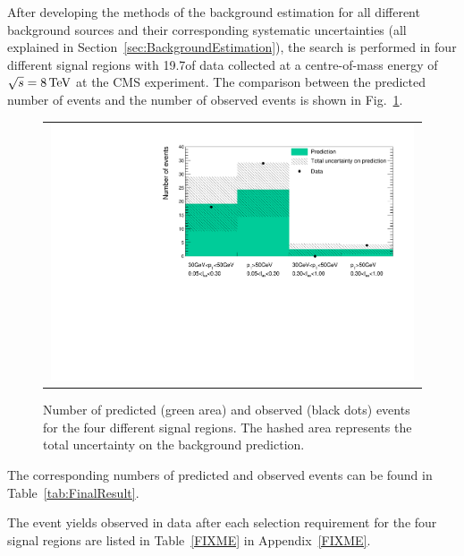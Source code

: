 After developing the methods of the background estimation for all different background sources and their corresponding systematic uncertainties (all explained in Section~\ref{sec:BackgroundEstimation}), 
the search is performed in four different signal regions with 19.7\fbinv of data collected at a centre-of-mass energy of $\sqrt{s} = 8\,\text{Te}\kern-0.06667em\text{V}$ at the CMS experiment.
The comparison between the predicted number of events and the number of observed events is shown in Fig.~\ref{fig:FinalResult}.
\begin{figure}[!b]
  \centering 
  \begin{tabular}{c}
    \includegraphics[width=0.99\textwidth]{figures/analysis/Results/FinalResultPlot.pdf} 
  \end{tabular}
  \caption{Number of predicted (green area) and observed (black dots) events for the four different signal regions. The hashed area represents the total uncertainty on the background prediction.}
  \label{fig:FinalResult}
\end{figure} 
The corresponding numbers of predicted and observed events can be found in Table~\ref{tab:FinalResult}.
\renewcommand{\arraystretch}{1.5}
\begin{table}[!h]
\centering
\caption{Number of predicted and observed events for the four different signal regions.}
\label{tab:FinalResult}
\end{table}
The event yields observed in data after each selection requirement for the four signal regions are listed in Table~\ref{FIXME} in Appendix~\ref{FIXME}.

